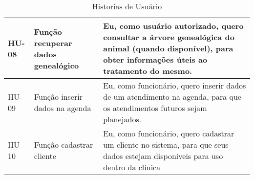 \documentclass[
    12pt,               %
    openright,          %
    oneside,
    a4paper,            %
    MODELO,             %
    TODO,               %
    english,            %
    brazil              %
    ]{ifsp-spo-inf-ctds}
\begin{document}
\begin{center}
\begin{table}[H]
\begin{tabulary}{1.0\textwidth}{|p{5em}|p{8em}|p{18em}|}
        \hline
        HU-08 &  Função recuperar dados genealógico &  Eu, como usuário autorizado, quero consultar a árvore genealógica do animal (quando disponível), para obter informações úteis ao tratamento do mesmo.\\
        \hline
        HU-09 & Função inserir dados na agenda & Eu, como funcionário, quero inserir dados de um atendimento na agenda, para que os atendimentos futuros sejam planejados.\\
        \hline
        HU-10 & Função cadastrar cliente & Eu, como funcionário, quero cadastrar um cliente no sistema, para que seus dados estejam disponíveis para uso dentro da clínica\\
        \hline
        \end{tabulary}
        \caption{Historias de Usuário}
        \label{tab:hist_usuario}
        \end{table}
    \end{center}

\end{document}
